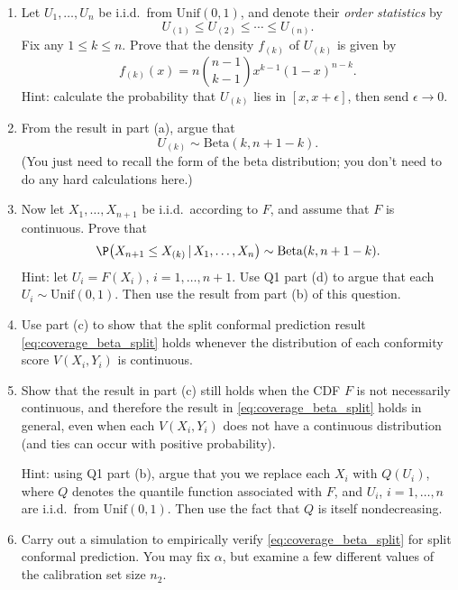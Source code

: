 \documentclass{article}
\begin{document}
\begin{enumerate}[label=(\alph*)]
\item Let $U_1,\dots,U_n$ be i.i.d.\ from $\mathrm{Unif}(0,1)$, and denote their
  \emph{order statistics} by  
  \[
  U_{(1)} \leq U_{(2)} \leq \cdots \leq U_{(n)}.
  \]
  Fix any $1 \leq k \leq n$. Prove that the density $f_{(k)}$ of $U_{(k)}$ is
  given by 
  \marginpar{\small [4 pts]}
  \[
  f_{(k)}(x) = n {n-1 \choose k-1} x^{k-1} (1-x)^{n-k}.
  \]
  Hint: calculate the probability that $U_{(k)}$ lies in $[x,x+\epsilon]$, then
  send $\epsilon \to 0$.
  
\item From the result in part (a), argue that 
  \marginpar{\small [1 pt]}
  \[
  U_{(k)} \sim \mathrm{Beta}(k, n+1-k).
  \]
  (You just need to recall the form of the beta distribution; you don't need to
  do any hard calculations here.)

\item Now let $X_1,\dots,X_{n+1}$ be i.i.d.\ according to $F$, and assume that
  $F$ is continuous. Prove that 
  \marginpar{\small [3 pts]}
  \[
  \P\big( X_{n+1} \leq X_{(k)} \,|\, X_1,\dots,X_n \big) \sim \mathrm{Beta}(k,
  n+1-k). 
  \]
  Hint: let $U_i = F(X_i)$, $i=1,\dots,n+1$. Use Q1 part (d) to argue that each
  $U_i \sim \mathrm{Unif}(0,1)$. Then use the result from part (b) of this
  question.  

\item Use part (c) to show that the split conformal prediction result
  \eqref{eq:coverage_beta_split} holds whenever the distribution of each
  conformity score $V(X_i,Y_i)$ is continuous.  
  \marginpar{\small [2 pts]}

\item Show that the result in part (c) still holds when the CDF $F$ is not 
  necessarily continuous, and therefore the result in
  \eqref{eq:coverage_beta_split} holds in general, even when each $V(X_i,Y_i)$
  does not have a continuous distribution (and ties can occur with positive
  probability).  
  \marginpar{\small [3 pts]}

  Hint: using Q1 part (b), argue that you we replace each $X_i$ with $Q(U_i)$,
  where $Q$ denotes the quantile function associated with $F$, and $U_i$, 
  $i=1,\dots,n$ are i.i.d.\ from $\mathrm{Unif}(0,1)$. Then use the fact that
  $Q$ is itself nondecreasing.

\item Carry out a simulation to empirically verify
  \eqref{eq:coverage_beta_split} for split conformal prediction. You may fix
  $\alpha$, but examine a few different values of the calibration set size
  $n_2$.   
  \marginpar{\small [5 pts]}
\end{enumerate}
\end{document}

